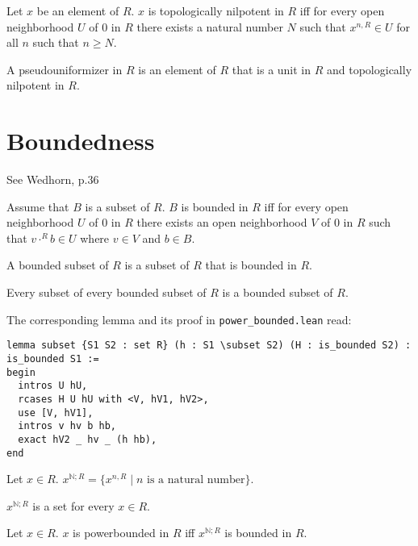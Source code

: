 \documentclass{article}
\begin{document}
\begin{forthel}
  \begin{definition}
    Let $x$ be an element of $R$.
    $x$ is topologically nilpotent in $R$ iff for every open neighborhood $U$ of $0$ in $R$
    there exists a natural number $N$ such that $x^{n,R} \in U$ for all $n$ such that $n \geq N$.
  \end{definition}

  \begin{definition}
    A pseudouniformizer in $R$ is an element of $R$ that is a unit in $R$ and topologically nilpotent in $R$.
  \end{definition}
\end{forthel}


\section{Boundedness}

See Wedhorn, p.36

\begin{forthel}
  \begin{definition}
    Assume that $B$ is a subset of $R$.
    $B$ is bounded in $R$ iff for every open neighborhood $U$ of $0$ in $R$
    there exists an open neighborhood $V$ of $0$ in $R$ such that $v \cdot^{R} b \in U$ where $v \in V$ and $b \in B$.
  \end{definition}

  \begin{definition}
    A bounded subset of $R$ is a subset of $R$ that is bounded in $R$.
  \end{definition}

  \begin{lemma}
    Every subset of every bounded subset of $R$ is a bounded subset of $R$.
  \end{lemma}
\end{forthel}

The corresponding lemma and its proof in \verb+power_bounded.lean+ read:

\begin{verbatim}
lemma subset {S1 S2 : set R} (h : S1 \subset S2) (H : is_bounded S2) :
is_bounded S1 :=
begin
  intros U hU,
  rcases H U hU with <V, hV1, hV2>,
  use [V, hV1],
  intros v hv b hb,
  exact hV2 _ hv _ (h hb),
end
\end{verbatim}

\begin{forthel}
  \begin{definition}
    Let $x \in R$.
    $x^{\mathbb{N};R} = \{ x^{n,R} \mid \text{$n$ is a natural number} \}$.
  \end{definition}

  \begin{axiom}
    $x^{\mathbb{N};R}$ is a set for every $x \in R$.
  \end{axiom}

  \begin{definition}
    Let $x \in R$.
    $x$ is powerbounded in $R$ iff $x^{\mathbb{N};R}$ is bounded in $R$.
  \end{definition}
\end{forthel}
\end{document}
